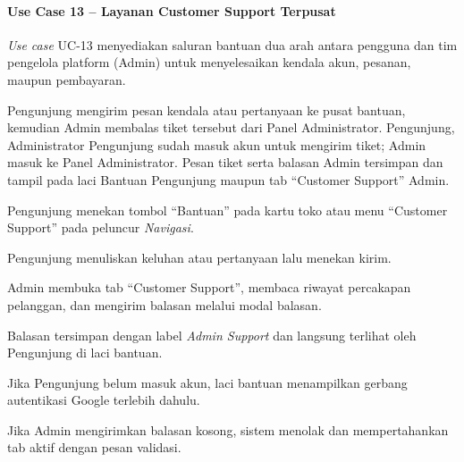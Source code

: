 \paragraph{Use Case 13 -- Layanan Customer Support Terpusat}
\textit{Use case} UC-13 menyediakan saluran bantuan dua arah antara pengguna dan tim pengelola platform (Admin) untuk menyelesaikan kendala akun, pesanan, maupun pembayaran.

{Pengunjung mengirim pesan kendala atau pertanyaan ke pusat bantuan, kemudian Admin membalas tiket tersebut dari Panel Administrator.}
{Pengunjung, Administrator}
{Pengunjung sudah masuk akun untuk mengirim tiket; Admin masuk ke Panel Administrator.}
{Pesan tiket serta balasan Admin tersimpan dan tampil pada laci Bantuan Pengunjung maupun tab ``Customer Support'' Admin.}
{\begin{uclist}
  \item Pengunjung menekan tombol ``Bantuan'' pada kartu toko atau menu ``Customer Support'' pada peluncur \textit{Navigasi}.
  \item Pengunjung menuliskan keluhan atau pertanyaan lalu menekan kirim.
  \item Admin membuka tab ``Customer Support'', membaca riwayat percakapan pelanggan, dan mengirim balasan melalui modal balasan.
  \item Balasan tersimpan dengan label \textit{Admin Support} dan langsung terlihat oleh Pengunjung di laci bantuan.
\end{uclist}}
{\begin{ucbullet}
  \item Jika Pengunjung belum masuk akun, laci bantuan menampilkan gerbang autentikasi Google terlebih dahulu.
  \item Jika Admin mengirimkan balasan kosong, sistem menolak dan mempertahankan tab aktif dengan pesan validasi.
\end{ucbullet}}
